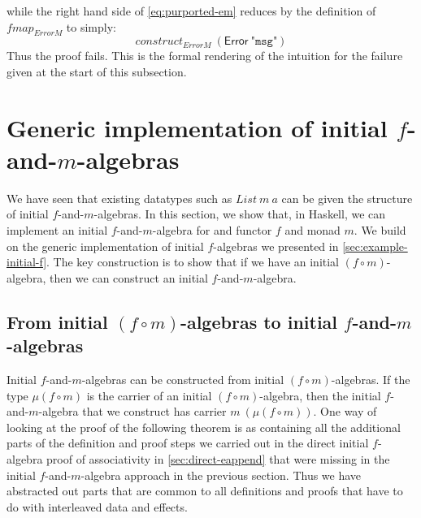 \documentclass{jfp1}
\begin{document}
while the right hand side of \autoref{eq:purported-em} reduces by the
definition of $\mathit{fmap}_{\mathit{ErrorM}}$ to simply:
\begin{displaymath}
  \mathit{construct}_{\mathit{ErrorM}}~(\mathsf{Error}~\texttt{"msg"})
\end{displaymath}
Thus the proof fails. This is the formal rendering of the intuition
for the failure given at the start of this subsection.


\section{Generic implementation of initial \texorpdfstring{$f$}{f}-and-\texorpdfstring{$m$}{m}-algebras}
\label{sec:impl-f-and-m}

We have seen that existing datatypes such as $\mathit{List}~m~a$ can
be given the structure of initial $f$-and-$m$-algebras. In this
section, we show that, in Haskell, we can implement an initial
$f$-and-$m$-algebra for and functor $f$ and monad $m$. We build on the
generic implementation of initial $f$-algebras we presented in
\autoref{sec:example-initial-f}. The key construction is to show that
if we have an initial $(f \circ m)$-algebra, then we can construct an
initial $f$-and-$m$-algebra.


\subsection{From initial \texorpdfstring{$(f \circ m)$}{(f . m)}-algebras to initial \texorpdfstring{$f$}{f}-and-\texorpdfstring{$m$}{m}-algebras}

Initial $f$-and-$m$-algebras can be constructed from initial $(f \circ
m)$-algebras. If the type $\mu(f \circ m)$ is the carrier of an
initial $(f \circ m)$-algebra, then the initial $f$-and-$m$-algebra
that we construct has carrier $m~(\mu (f \circ m))$. One way of
looking at the proof of the following theorem is as containing all the
additional parts of the definition and proof steps we carried out in
the direct initial $f$-algebra proof of associativity in
\autoref{sec:direct-eappend} that were missing in the initial
$f$-and-$m$-algebra approach in the previous section. Thus we have
abstracted out parts that are common to all definitions and proofs
that have to do with interleaved data and effects.
\end{document}
